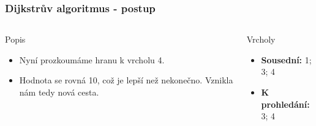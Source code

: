 \documentclass{beamer}
\begin{document}
\begin{frame}
    \frametitle{Dijkstrův algoritmus - postup}
    \begin{columns}
        \begin{block}{Popis}
            \begin{itemize}
                \item Nyní prozkoumáme hranu k vrcholu 4.
                \item Hodnota se rovná 10, což je lepší než nekonečno. Vznikla nám tedy nová cesta.
            \end{itemize}
        \end{block}
        \begin{block}{Vrcholy}
            \begin{itemize}
                \item \textbf{Sousední:} 1; 3; 4 
                \item \textbf{K prohledání:} 3; 4
            \end{itemize}
        \end{block}
    \end{columns}
\end{frame}
\end{document}
